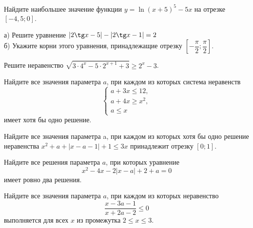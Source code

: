 \begin{homework}[number=2]
	\begin{listofex}
		\item Найдите наибольшее значение функции \( y=\ln(x+5)^5-5x \) на отрезке \( [-4,5;0] \).
		\item
		а) Решите уравнение \( |2\tg x - 5| - |2\tg x - 1|=2 \)\\
		б) Укажите корни этого уравнения, принадлежащие отрезку \( \left[ -\dfrac{\pi}{2};\dfrac{\pi}{2} \right] \).
		\item Решите неравенство \( \sqrt{3\cdot4^x-5\cdot2^{x+1}+3}\ge2^x-3 \).
		\item Найдите все значения параметра \( a \), при каждом из которых система неравенств
		\[ \left\{
		\begin{array}{l}
			a+3x\le12,\\
			a+4x\ge x^2,\\
			a\le x
		\end{array}
		\right. \]
		имеет хотя бы одно решение.
		\item Найдите все значения параметра a, при каждом из которых хотя бы одно решение неравенства
		\( x^2+a+|x-a-1|+1\le3x \) принадлежит отрезку \( [0;1] \).
		\item Найдите все решения параметра \( a \), при которых уравнение
		\[ x^2-4x-2|x-a|+2+a=0 \]
		имеет ровно два решения.
		\item Найдите все значения параметра \( a \), при каждом из которых неравенство
		\[ \dfrac{x-3a-1}{x+2a-2}\le0 \]
		выполняется для всех \( x \) из промежутка \( 2\le x\le3 \).
	\end{listofex}
\end{homework}

